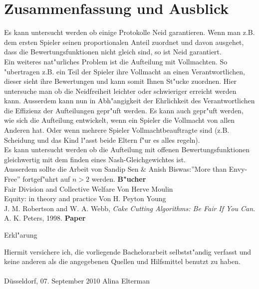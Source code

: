 \documentclass[11pt, a4paper, twoside]{article}
\numberwithin{equation}{section}
\begin{document}
\section{Zusammenfassung und Ausblick}
Es kann untersucht werden ob einige Protokolle Neid garantieren. Wenn man z.B. dem ersten Spieler seinen proportionalen Anteil zuordnet und davon ausgehet, dass die Bewertungsfunktionen nicht gleich sind, so ist Neid garantiert.\\
Ein weiteres nat"urliches Problem ist die Aufteilung mit Vollmachten. So "ubertragen z.B. ein Teil der Spieler ihre Vollmacht an einen Verantwortlichen, dieser sieht ihre Bewertungen und kann somit Ihnen St"ucke zuordnen. Hier untersuche man ob die Neidfreiheit leichter oder schwieriger erreicht werden kann. Ausserdem kann nun in Abh"angigkeit der Ehrlichkeit des Verantwortlichen die Effizienz der Aufteilungen gepr"uft werden. Es kann auch gepr"uft werden, wie sich die Aufteilung entwickelt, wenn ein Spieler die Vollmacht von allen Anderen hat. Oder wenn mehrere Spieler Vollmachtbeauftragte sind (z.B. Scheidung und das Kind l"asst beide Eltern f"ur es alles regeln).\\
Es kann untersucht werden ob die Aufteilung mit offenen Bewertungsfunktionen gleichwertig mit dem finden eines Nash-Gleichgewichtes ist.\\ Ausserdem sollte die Arbeit von Sandip Sen $\&$ Anish Biswas:''More than Envy-Free'' fortgef"uhrt auf $n>2$ werden.
\newpage
\textbf{B"ucher}\\
Fair Division and Collective Welfare Von Herve Moulin\\
Equity: in theory and practice Von H. Peyton Young\\
J. M. Robertson and W. A. Webb,
                      \emph{Cake Cutting Algorithms: Be Fair If You Can}. A. K. Peters, 1998. \newline
\textbf{Paper}\\

\thispagestyle{plain}
\renewcommand{\refname}{Literaturverzeichnis}



\newpage
\thispagestyle{empty}

\begin{center}
\Huge Erkl"arung
\end{center}
\vspace{1cm}
\noindent Hiermit versichere ich, die vorliegende Bachelorarbeit selbstst"andig verfasst und keine anderen als die angegebenen Quellen und Hilfsmittel benutzt zu haben.\\
\vspace{3cm}\\
Düsseldorf, 07. September 2010 \hfill Alina Elterman
\end{document}
